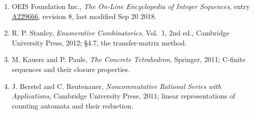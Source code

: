 \documentclass[11pt]{article}
\theoremstyle{definition}
\begin{document}
\begin{enumerate}

\item OEIS Foundation Inc., \emph{The On-Line Encyclopedia of Integer Sequences}, entry \href{https://oeis.org/A229666}{A229666}, revision 8, last modified Sep 20 2018.

\item R. P. Stanley, \emph{Enumerative Combinatorics}, Vol.~1, 2nd ed., Cambridge University Press, 2012; \S4.7, the transfer-matrix method.

\item M. Kauers and P. Paule, \emph{The Concrete Tetrahedron}, Springer, 2011; C-finite sequences and their closure properties.

\item J. Berstel and C. Reutenauer, \emph{Noncommutative Rational Series with Applications}, Cambridge University Press, 2011; linear representations of counting automata and their reduction.

\end{enumerate}
\end{document}
